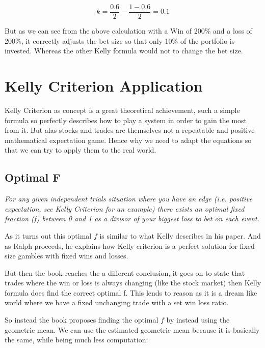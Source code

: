 \documentclass[12pt]{article}
\begin{document}
    \[k = \frac{0.6}{2} - \frac{1 - 0.6}{2} = 0.1\]

    But as we can see from the above calculation with a Win of 200\% and a loss of 200\%, it 
    correctly adjusts the bet size so that only 10\% of the portfolio is invested. Whereas the 
    other Kelly formula would not to change the bet size.

\section{Kelly Criterion Application}

    Kelly Criterion as concept is a great theoretical achievement, such a simple formula so
    perfectly describes how to play a system in order to gain the most from it. But alas
    stocks and trades are themselves not a repeatable and positive mathematical expectation
    game. Hence why we need to adapt the equations so that we can try to apply them to the
    real world.

\subsection{Optimal F}

    \begin{displayquote} \textit {
        For any given independent trials situation where you have an edge (i.e. positive 
        expectation, see Kelly Criterion for an example) there exists an optimal fixed
        fraction (f) between 0 and 1 as a divisor of your biggest loss to bet on each event.
    } \end{displayquote}

    As it turns out this optimal \(f\) is similar to what Kelly describes in his paper. 
    And as Ralph proceeds, he explains how Kelly criterion is a perfect solution for 
    fixed size gambles with fixed wins and losses.

    But then the book reaches the a different conclusion, it goes on to state that trades where 
    the win or loss is always changing {(like the stock market)} then Kelly formula does find
    the correct optimal f. This lends to reason as it is a dream like world where we have a
    fixed unchanging trade with a set win loss ratio.

    So instead the book proposes finding the optimal \(f\) by instead using the geometric
    mean. We can use the estimated geometric mean because it is basically the same, while
    being much less computation:
\end{document}
